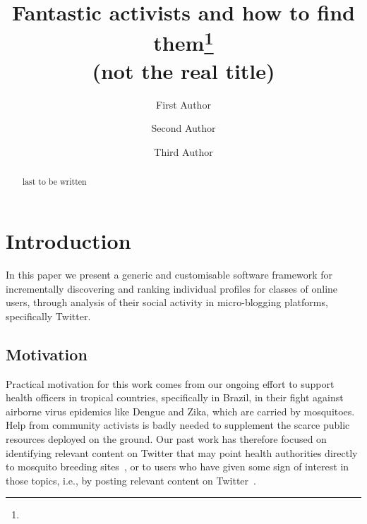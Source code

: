 \documentclass[runningheads]{llncs}
\begin{document}
%
\title{Fantastic activists and how to find them\thanks{} \\ \small (not the real title)}
%
%
\author{First Author \and
Second Author \and
Third Author}
%
%
%
\maketitle       %
%
\begin{abstract}
last to be written
\end{abstract}
%

%
%
\section{Introduction}

In this paper we present a generic and customisable software framework for incrementally discovering and ranking individual profiles for classes of online users, through analysis of their social activity in micro-blogging platforms, specifically Twitter.

\subsection{Motivation} \label{sec:motivation}

Practical motivation for this work comes from our ongoing effort to support health officers in tropical countries, specifically in Brazil, in their fight against airborne virus epidemics like Dengue and Zika, which are carried by mosquitoes. Help from community activists is badly needed to supplement the scarce public resources deployed on the ground. Our past work has therefore focused on identifying relevant content on Twitter that may point health authorities directly to mosquito breeding sites~\cite{Sousa2018}, or to users who have given some sign of interest in those topics, i.e., by posting relevant content on Twitter~\cite{Missier2017}. 
\end{document}
